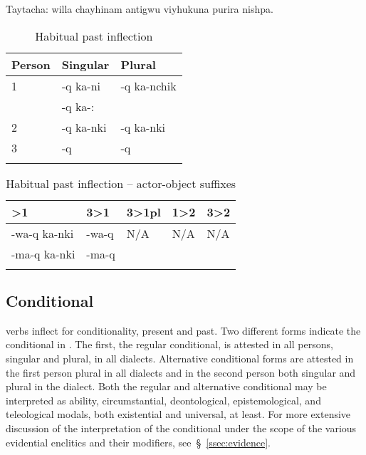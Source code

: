 %
{Taytacha: willa chayhinam antigwu viyhukuna purira nishpa.}%
{}%
{}{}%

\begin{table}[!ht]
\small\centering
\caption{Habitual past inflection}\label{Tab20a}
\begin{tabular}{lll}
\lsptoprule
Person		& Singular		& Plural	\\
\midrule
1	& -q ka-ni\tss{\AMV,\LT}	& -q ka-nchik	\\
	& -q ka-:\tss{\ACH,\CH,\SP}	&				\\[2ex]
2	&	-q ka-nki				&-q ka-nki		\\[2ex]
3	&	-q						&-q				\\
\lspbottomrule
\end{tabular}
\end{table}

\begin{table}[!ht]
\small\centering
\caption{Habitual past inflection -- actor-object suffixes}\label{Tab20b}
\begin{tabular}{lllll}
\lsptoprule
2>1		& 3>1		& 3>1pl	& 1>2	& 3>2	\\
\midrule
-wa-q ka-nki\tss{\AMV,\LT}	&	-wa-q\tss{\AMV,\LT}	&	N/A	&	N/A	&	N/A	\\
-ma-q ka-nki\tss{\ACH,\CH,\SP}	&	-ma-q\tss{\ACH,\CH,\SP}	&	 	&	 	&	 	\\
\lspbottomrule
\end{tabular}
\end{table}

\subsection{Conditional}\label{ssec:conditional}
\SYQ{} verbs inflect for conditionality, present and past. Two different forms indicate the conditional in \SYQ. The first, the regular conditional, is attested in all persons, singular and plural, in all dialects. Alternative conditional forms are attested in the first person plural in all dialects and in the second person both singular and plural in the \AMV{} dialect. Both the regular and alternative conditional may be interpreted as ability, circumstantial, deontological, epistemological, and teleological modals, both existential and universal, at least. For more extensive discussion of the interpretation of the conditional under the scope of the various evidential enclitics and their modifiers, see~§~\ref{ssec:evidence}.

